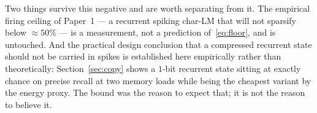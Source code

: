 Two things survive this negative and are worth separating from it. The empirical firing
ceiling of Paper~1 --- a recurrent spiking char-LM that will not sparsify below
$\approx 50\%$ --- is a measurement, not a prediction of~\eqref{eq:floor}, and is untouched.
And the practical design conclusion that a compressed recurrent state should not be carried
in spikes is established here empirically rather than theoretically: Section~\ref{sec:copy}
shows a $1$-bit recurrent state sitting at exactly chance on precise recall at two memory
loads while being the cheapest variant by the energy proxy. The bound was the reason to
expect that; it is not the reason to believe it.
